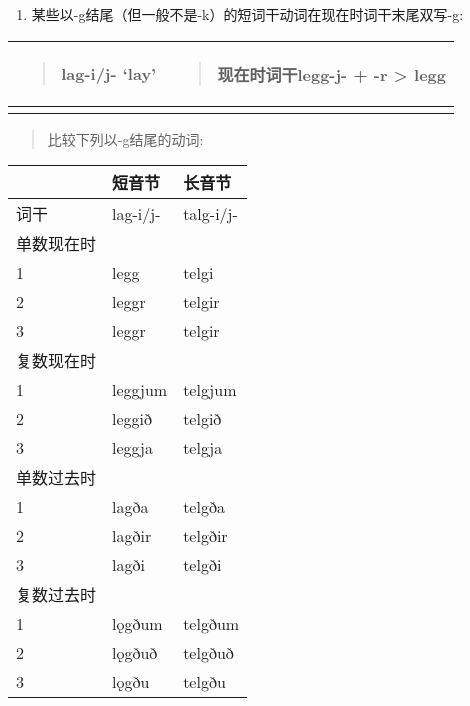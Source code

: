 \begin{enumerate}
  \def\labelenumi{\arabic{enumi})}
  \setcounter{enumi}{1}
  \item
        某些以-g结尾（但一般不是-k）的短词干动词在现在时词干末尾双写-g:
\end{enumerate}

\begin{longtable}{ll}
  \toprule
  \begin{quote}lag-i/j- `lay‌'\end{quote} & \begin{quote}现在时词干legg-j- + -r \textgreater{} legg\end{quote} \\
  \midrule
  \endhead
  \bottomrule
  \endfoot
\end{longtable}

\begin{quote}
  比较下列以-g结尾的动词:
\end{quote}

\begin{longtable}{lll}
  \toprule
             & 短音节   & 长音节    \\
  \midrule
  \endhead
  \bottomrule
  \endfoot
  词干       & lag-i/j- & talg-i/j- \\
  单数现在时 &          &           \\
  1          & legg     & telgi     \\
  2          & leggr    & telgir    \\
  3          & leggr    & telgir    \\
  复数现在时 &          &           \\
  1          & leggjum  & telgjum   \\
  2          & leggið   & telgið    \\
  3          & leggja   & telgja    \\
  单数过去时 &          &           \\
  1          & lagða    & telgða    \\
  2          & lagðir   & telgðir   \\
  3          & lagði    & telgði    \\
  复数过去时 &          &           \\
  1          & lǫgðum   & telgðum   \\
  2          & lǫgðuð   & telgðuð   \\
  3          & lǫgðu    & telgðu    \\
\end{longtable}

